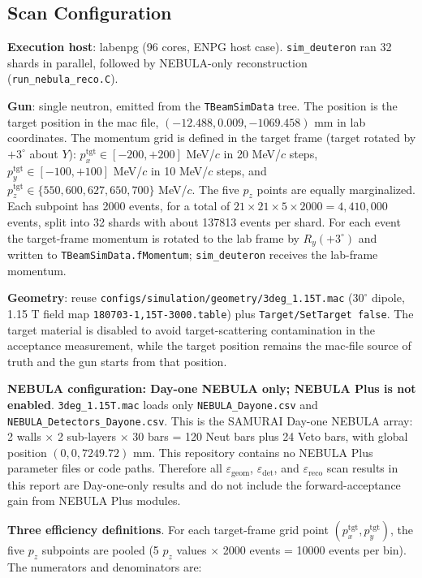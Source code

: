 \documentclass[a4paper,11pt]{article}
\begin{document}
\subsection{Scan Configuration}

\textbf{Execution host}: labenpg (96 cores, ENPG host case). \texttt{sim\_deuteron}
ran 32 shards in parallel, followed by NEBULA-only reconstruction
(\texttt{run\_nebula\_reco.C}).

\textbf{Gun}: single neutron, emitted from the \texttt{TBeamSimData} tree. The
position is the target position in the mac file,
$(-12.488, 0.009, -1069.458)$ mm in lab coordinates. The momentum grid is
defined in the target frame (target rotated by $+3^\circ$ about $Y$):
$p_x^\mathrm{tgt} \in [-200,+200]$ MeV/$c$ in 20 MeV/$c$ steps,
$p_y^\mathrm{tgt} \in [-100,+100]$ MeV/$c$ in 10 MeV/$c$ steps, and
$p_z^\mathrm{tgt} \in \{550,600,627,650,700\}$ MeV/$c$. The five $p_z$ points
are equally marginalized. Each subpoint has 2000 events, for a total of
$21 \times 21 \times 5 \times 2000 = 4{,}410{,}000$ events, split into
32 shards with about 137813 events per shard. For each event the target-frame
momentum is rotated to the lab frame by $R_y(+3^\circ)$ and written to
\texttt{TBeamSimData.fMomentum}; \texttt{sim\_deuteron} receives the lab-frame
momentum.

\textbf{Geometry}: reuse
\texttt{configs/simulation/geometry/3deg\_1.15T.mac} ($30^\circ$ dipole,
1.15 T field map \texttt{180703-1,15T-3000.table}) plus
\texttt{Target/SetTarget false}. The target material is disabled to avoid
target-scattering contamination in the acceptance measurement, while the target
position remains the mac-file source of truth and the gun starts from that
position.

\textbf{NEBULA configuration: Day-one NEBULA only; NEBULA Plus is not enabled}.
\texttt{3deg\_1.15T.mac} loads only \texttt{NEBULA\_Dayone.csv} and
\texttt{NEBULA\_Detectors\_Dayone.csv}. This is the SAMURAI Day-one NEBULA
array: 2 walls $\times$ 2 sub-layers $\times$ 30 bars = 120 Neut bars plus
24 Veto bars, with global position $(0,0,7249.72)$ mm. This repository contains
no NEBULA Plus parameter files or code paths. Therefore all
$\varepsilon_\mathrm{geom}$, $\varepsilon_\mathrm{det}$, and
$\varepsilon_\mathrm{reco}$ scan results in this report are Day-one-only results
and do not include the forward-acceptance gain from NEBULA Plus modules.

\textbf{Three efficiency definitions}. For each target-frame grid point
$(p_x^\mathrm{tgt},p_y^\mathrm{tgt})$, the five $p_z$ subpoints are pooled
(5 $p_z$ values $\times$ 2000 events = 10000 events per bin). The numerators and
denominators are:
\end{document}
